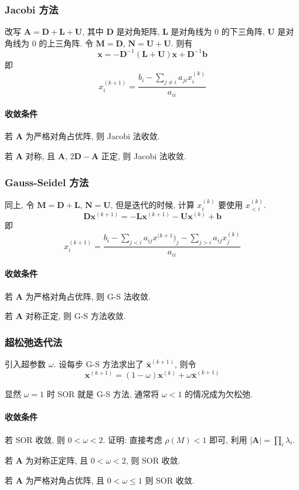\documentclass{ctexart}
\begin{document}
\subsubsection{Jacobi 方法}
    改写 $\mathbf{A} = \mathbf{D} + \mathbf{L} + \mathbf{U}$, 其中 $\mathbf{D}$ 是对角矩阵,
    $\mathbf{L}$ 是对角线为 0 的下三角阵, $\mathbf{U}$ 是对角线为 0 的上三角阵.
    令 $\mathbf{M} = \mathbf{D}$, $\mathbf{N} = \mathbf{U} + \mathbf{U}$. 则有 \[
        \mathbf{x} = - \mathbf{D}^{-1} (\mathbf{L} + \mathbf{U}) \mathbf{x} + \mathbf{D}^{-1} \mathbf{b}\]
    即 \[
        x^{(k+1)}_i = \frac{b_i - \sum_{j \neq i} a_{ji} x^{(k)}_i}{a_{ii}}\]
\paragraph{收敛条件}
    若 $\mathbf{A}$ 为严格对角占优阵, 则 Jacobi 法收敛.\par
    若 $\mathbf{A}$ 对称, 且 $\mathbf{A}$, $2 \mathbf{D} - \mathbf{A}$ 正定, 则 Jacobi 法收敛.
\subsubsection{Gauss-Seidel 方法}
    同上, 令 $\mathbf{M} = \mathbf{D}+  \mathbf{L} $, $\mathbf{N} = \mathbf{U}$,
    但是迭代的时候, 计算 $x^{(k)}_i$ 要使用 $x^{(k)}_{<i}$. \[
        \mathbf{D} \mathbf{x}^{(k+1)} = - \mathbf{L} \mathbf{x}^{(k+1)} - \mathbf{U} \mathbf{x}^{(k)} + \mathbf{b}\]
    即 \[
        x^{(k+1)}_i = \frac{b_i - \sum_{j < i} a_{ij} x^{(k+1})_j - \sum_{j > i} a_{ij} x^{(k)}_j}{a_{ii}}\]
\paragraph{收敛条件}
    若 $\mathbf{A}$ 为严格对角占优阵, 则 G-S 法收敛.\par
    若 $\mathbf{A}$ 对称正定, 则 G-S 方法收敛.
\subsubsection{超松弛迭代法}
    引入超参数 $\omega$. 设每步 G-S 方法求出了 $\bar{\mathbf{x}}^{(k+1)}$, 则令 \[
        \mathbf{x}^{(k+1)} = (1 - \omega) \mathbf{x}^{(k)} + \omega \bar{\mathbf{x}}^{(k+1)}\]
    \par
    显然 $\omega = 1$ 时 SOR 就是 G-S 方法, 通常将 $\omega < 1$ 的情况成为欠松弛.\par
\paragraph{收敛条件}
    若 SOR 收敛, 则 $0 < \omega < 2$. 证明: 直接考虑 $\rho(M) < 1$ 即可, 利用 $|\mathbf{A}| = \prod_i \lambda_i$.\par
    若 $\mathbf{A}$ 为对称正定阵, 且 $0 < \omega < 2$, 则 SOR 收敛.\par
    若 $\mathbf{A}$ 为严格对角占优阵, 且 $0 < \omega \le 1$ 则 SOR 收敛.
\end{document}
